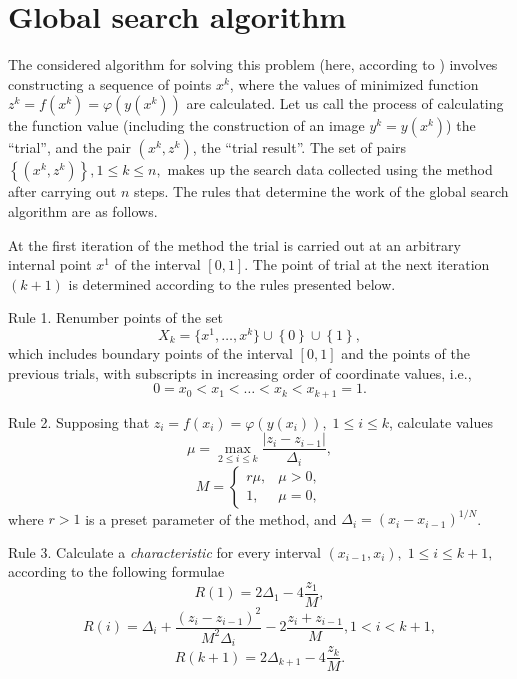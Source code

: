\documentclass{llncs}
\begin{document}
\section{Global search algorithm}\label{sec:1}

The considered algorithm for solving this problem (here, according to \cite{Strongin2000}) involves constructing a sequence of points $x^k$, where the values of minimized function $z^k = f(x^k)=\varphi(y(x^k))$ are calculated. Let us call the process of calculating the function value (including the construction of an image $y^k=y(x^k)$) the ``trial'', and the pair $(x^k, z^k)$, the ``trial result''. The set of pairs $\left\{(x^k, z^k)\right\}, 1\leq k\leq n,$ makes up the search data collected using the method after carrying out $n$ steps. The rules that determine the work of the global search algorithm are as follows.

At the first iteration of the method the trial is carried out at an arbitrary internal point $x^1$ of the interval $[0,1]$. The point of trial at the next iteration $(k+1)$ is determined according to the rules presented below.

Rule 1. Renumber points of the set
\[
X_k=\{x^1,\dots,x^k\}\cup\left\{0\right\}\cup\left\{1\right\},
\]
which includes boundary points of the interval $[0,1]$ and the points of the previous trials, with subscripts in increasing order of coordinate values, i.e.,
\[
0=x_0<x_1<\dots <x_k<x_{k+1}=1.
\]

Rule 2. Supposing that  $z_i=f(x_i)=\varphi(y(x_i)), \; 1\leq i \leq k$, calculate values 
\begin{equation}\label{eq:11}
\mu = \max_{2\leq i \leq k}\frac{\left|z_i-z_{i-1}\right|}{\Delta_i},
\end{equation}
\[
M = \left\{
   \begin{array}{lr}
     r\mu, & \mu > 0,\\
     1, & \mu = 0,
   \end{array}
\right.
 \]
where $r>1$ is a preset parameter of the method, and $\Delta_i=\left(x_i-x_{i-1}\right)^{1/N}$.

Rule 3. Calculate a \textit{characteristic} for every interval $(x_{i-1}, x_i), \; 1\leq i \leq k+1,$   according to the following formulae
\[
R(1)=2\Delta_1-4\frac{z_1}{M},
\]
\begin{equation}\label{eq:14}
R(i)=\Delta_i+\frac{(z_i-z_{i-1})^2}{M^2\Delta_i}-2\frac{z_i+z_{i-1}}{M},1<i<k+1,
\end{equation}
\[
R(k+1)=2\Delta_{k+1}-4\frac{z_k}{M}.
\]
\end{document}
